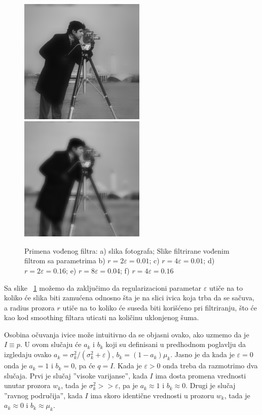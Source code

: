 \documentclass[a4paper,12pt,titlepage]{article}
\begin{document}
\begin{figure}[ht!]
\includegraphics[width=60mm]{img/imgGF8_04.png}
\includegraphics[width=60mm]{img/imgGF4_16.png}
\caption{Primena vođenog filtra: a) slika fotografa; Slike filtrirane vođenim filtrom sa parametrima b) $r = 2 \varepsilon = 0.01$; c) $r = 4 \varepsilon = 0.01$; d) $r = 2 \varepsilon = 0.16$; e) $r = 8 \varepsilon = 0.04$; f) $r = 4 \varepsilon = 0.16$}
\label{gfilter}
\end{figure}

Sa slike ~\ref{gfilter} možemo da zaključimo da regularizacioni parametar $\varepsilon$ utiče na to koliko će slika biti zamućena odnosno šta je na slici ivica koja trba da se sačuva, a radius prozora $r$ utiče na to koliko će suseda biti korišćeno pri filtriranju, što će kao kod smoothing filtara uticati na količinu uklonjenog šuma. 

Osobina očuvanja ivice može intuitivno da se objasni ovako, ako uzmemo da je $I \equiv p$. U ovom slučaju će $a_k$ i $b_k$ koji su definisani u predhodnom poglavlju da izgledaju ovako $a_k = \sigma_k^2 / (\sigma_k^2 + \varepsilon)$, $b_k = (1 - a_k)\mu_k$. Jasno je da kada je $\varepsilon = 0$ onda je $a_k = 1$ i $b_k = 0$, pa će $q = I$. Kada je $\varepsilon > 0$ onda treba da razmotrimo dva slučaja. Prvi je slučaj ''visoke varijanse'', kada $I$ ima dosta promena vrednosti unutar prozora $w_k$, tada je $\sigma_k^2 >> \varepsilon$, pa je $a_k \approx 1$ i $b_k \approx 0$. Drugi je slučaj ''ravnog područija'', kada $I$ ima skoro identične vrednosti u prozoru $w_k$, tada je $a_k \approx 0$ i $b_k \approx \mu_k$. 
\end{document}
